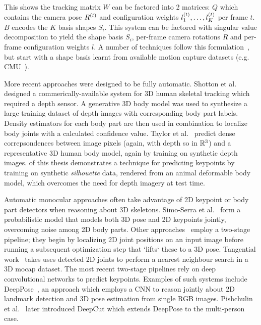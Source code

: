 
    This shows the tracking matrix $W$ can be factored into 2 matrices: $Q$ which contains the camera pose $R^{(t)}$ and configuration weights $l_{1}^{(t)}, \dots, l_{K}^{(t)}$ per frame ${t}$. $B$ encodes the $K$ basis shapes $S_{i}$. This system can be factored with singular value decomposition to yield the shape basis $S_{i}$, per-frame camera rotations $R$ and per-frame configuration weights $l$. A number of techniques follow this formulation~\cite{xxx, xxx, xxx}, but start with a shape basis learnt from available motion capture datasets (e.g. CMU~\cite{xxx}).

    More recent approaches were designed to be fully automatic. Shotton et al.~\cite{kinectpaper} designed a commerically-available system for 3D human skeletal tracking which required a depth sensor. A generative 3D body model was used to synthesize a large training dataset of depth images with corresponding body part labels. Density estimators for each body part are then used in combination to localize body joints with a calculated confidence value. Taylor et al.~\cite{taylor2012vitruvian} predict dense correpsondences between image pixels (again, with depth so in ${\mathbb{R}^{3}}$) and a representative 3D human body model, again by training on synthetic depth images.  of this thesis demonstrates a technique for predicting keypoints by training on synthetic \emph{silhouette} data, rendered from an animal deformable body model, which overcomes the need for depth imagery at test time.

    Automatic monocular approaches often take advantage of 2D keypoint or body part detectors when reasoning about 3D skeletons. Simo-Serra et al.~\cite{xxx, xxx} form a probabilistic model that models both 3D pose and 2D keypoints jointly, overcoming noise among 2D body parts. Other approaches~\cite{xxx, xxx} employ a two-stage pipeline; they begin by localizing 2D joint positions on an input image before running a subsequent optimization step that `lifts` these to a 3D pose. Tangential work~\cite{xxx} takes uses detected 2D joints to perform a nearest neighbour search in a 3D mocap dataset. The most recent two-stage pipelines rely on deep convolutional networks to predict keypoints. Examples of such systems include DeepPose~\cite{toshev2014deeppose}, an approach which employs a CNN to reason jointly about 2D landmark detection and 3D pose estimation from single RGB images. Pishchulin et al.~\cite{pishchulin2016deepcut} later introduced DeepCut which extends DeepPose to the multi-person case.

